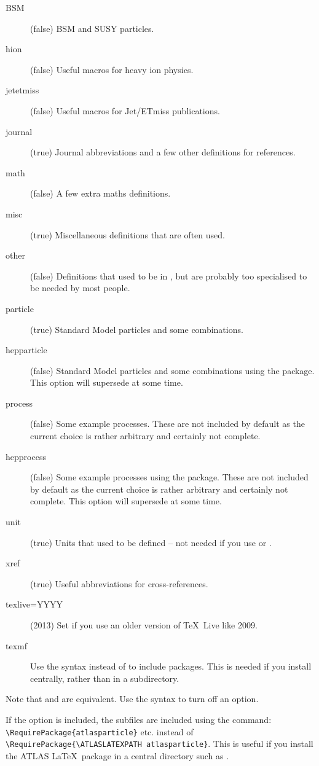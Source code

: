 \begin{description}
\item[BSM](false) BSM and SUSY particles.
\item[hion](false) Useful macros for heavy ion physics.
\item[jetetmiss](false) Useful macros for Jet/ETmiss publications.
\item[journal](true) Journal abbreviations and a few other definitions for references.
\item[math](false) A few extra maths definitions.
\item[misc](true) Miscellaneous definitions that are often used.
\item[other](false) Definitions that used to be in , 
  but are probably too specialised to be needed by most people.
\item[particle](true) Standard Model particles and some combinations.
\item[hepparticle](false) Standard Model particles and some combinations using the  package.
  This option will supersede  at some time.
\item[process](false) Some example processes. 
  These are not included by default as the current choice is rather arbitrary
  and certainly not complete.
\item[hepprocess](false) Some example processes using the  package.
  These are not included by default as the current choice is rather arbitrary
  and certainly not complete.
  This option will supersede  at some time.
\item[unit](true) Units that used to be defined -- not needed if you use  or .
\item[xref](true) Useful abbreviations for cross-references.
\item[texlive=YYYY](2013) Set if you use an older version of \TeX\ Live like 2009.
\item[texmf] Use the syntax 
  instead of  to include packages.
  This is needed if you install  centrally,
  rather than in a  subdirectory.
\end{description}
Note that  and  are equivalent.
Use the syntax  to turn off an option.

If the  option  is included, the subfiles are included using the command:
\verb|\RequirePackage{atlasparticle}| etc. instead of \verb|\RequirePackage{\ATLASLATEXPATH atlasparticle}|.
This is useful if you install the ATLAS \LaTeX\ package in a central directory such as .

